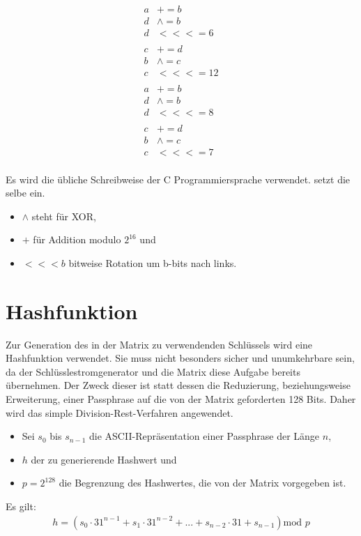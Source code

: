 \documentclass[10pt,a4paper]{article}
\begin{document}
\begin{align*}
    a & +=       b  \\
    d & \wedge = b  \\
    d & <<<=     6  \\
      &             \\
    c & +=       d  \\
    b & \wedge = c  \\
    c & <<<=     12 \\
      &             \\
    a & +=       b  \\
    d & \wedge = b  \\
    d & <<<=     8  \\
      &             \\
    c & +=       d  \\
    b & \wedge = c  \\
    c & <<<=     7  \\
\end{align*}

Es wird die übliche Schreibweise der C Programmiersprache verwendet.
\cite{Bernstein2008} setzt die selbe ein.
\begin{itemize}
    \item $\wedge$ steht für XOR,
    \item $+$ für Addition modulo $2^{16}$ und
    \item $<<<b$ bitweise Rotation um b-bits nach links.
\end{itemize}

\section{Hashfunktion}

Zur Generation des in der Matrix zu verwendenden Schlüssels wird eine Hashfunktion verwendet.
Sie muss nicht besonders sicher und unumkehrbare sein, da der Schlüsslestromgenerator und die Matrix diese Aufgabe bereits übernehmen.
Der Zweck dieser ist statt dessen die Reduzierung, beziehungsweise Erweiterung, einer Passphrase auf die von der Matrix geforderten 128 Bits.
Daher wird das simple Division-Rest-Verfahren\cite{Silies2021} angewendet.

\begin{itemize}
    \item Sei $s_0$ bis $s_{n-1}$ die ASCII-Repräsentation einer Passphrase der Länge $n$,
    \item $h$ der zu generierende Hashwert und
    \item $p = 2^{128}$ die Begrenzung des Hashwertes, die von der Matrix vorgegeben ist.
\end{itemize}
Es gilt:
\begin{align*}
    h = \left( s_0 \cdot 31^{n-1} + s_1 \cdot 31^{n-2} + ... + s_{n-2} \cdot 31 + s_{n-1}\right)\text{mod } p
\end{align*}
\end{document}
